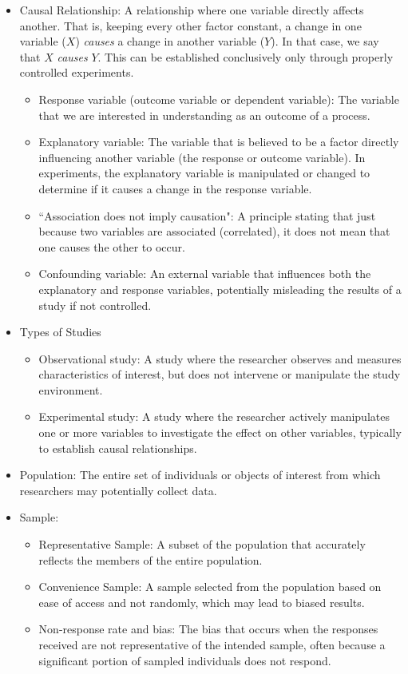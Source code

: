 \documentclass{article}
\begin{document}
\begin{itemize}
\item Causal Relationship: A relationship where one variable directly affects another. That is, keeping every other factor constant, a change in one variable ($X$) \emph{causes} a change in another variable ($Y$). In that case, we say that $X$ \emph{causes} $Y$. This can be established conclusively only through properly controlled experiments.
    \begin{itemize}
        \item Response variable (outcome variable or dependent variable): The variable that we are interested in understanding as an outcome of a process. 
        \item Explanatory variable: The variable that is believed to be a factor directly influencing another variable (the response or outcome variable). In experiments, the explanatory variable is manipulated or changed to determine if it causes a change in the response variable. 
        \item ``Association does not imply causation": A principle stating that just because two variables are associated (correlated), it does not mean that one causes the other to occur.
        \item Confounding variable: An external variable that influences both the explanatory and response variables, potentially misleading the results of a study if not controlled.
    \end{itemize}
\item Types of Studies
    \begin{itemize}
        \item Observational study: A study where the researcher observes and measures characteristics of interest, but does not intervene or manipulate the study environment.
        \item Experimental study: A study where the researcher actively manipulates one or more variables to investigate the effect on other variables, typically to establish causal relationships.
    \end{itemize}
\item Population: The entire set of individuals or objects of interest from which researchers may potentially collect data.
\item Sample:
    \begin{itemize}
        \item Representative Sample: A subset of the population that accurately reflects the members of the entire population.
        \item Convenience Sample: A sample selected from the population based on ease of access and not randomly, which may lead to biased results.
        \item Non-response rate and bias: The bias that occurs when the responses received are not representative of the intended sample, often because a significant portion of sampled individuals does not respond.
    \end{itemize}


\end{itemize}
\end{document}
